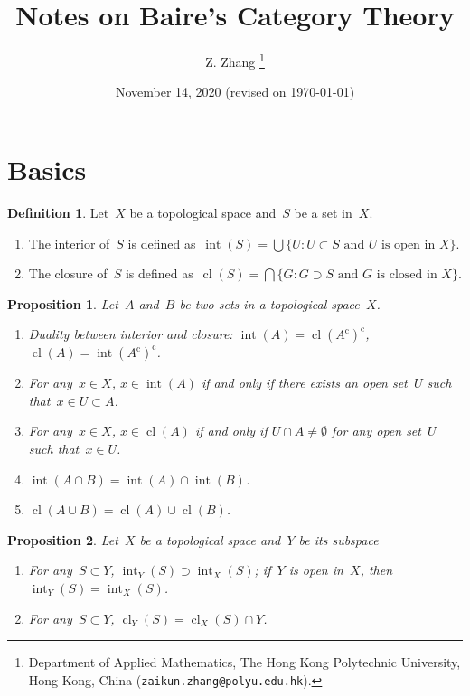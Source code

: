 \documentclass[11pt,a4paper]{article}
\title{Notes on Baire's Category Theory}
\date{November 14, 2020 (revised on \today)}
\author{
Z. Zhang
\thanks{
Department of Applied Mathematics, The Hong Kong Polytechnic
University, Hong Kong, China ({\tt zaikun.zhang@polyu.edu.hk}).
}
}
\newtheorem{proposition}{Proposition}[section]
\theoremstyle{definition}
\newtheorem{definition}{Definition}[section]
\newcommand{\co}{{\mathrm{c}}}
\DeclareMathOperator{\inter}{int}
\DeclareMathOperator{\cl}{cl}
\numberwithin{equation}{section}
\begin{document}
\maketitle

\section{Basics}

\begin{definition}
  \label{def:intcl}
  Let~$X$ be a topological space and~$S$ be a set in~$X$. 
  \begin{enumerate}
    \item The interior of~$S$ is defined as~$\inter(S) = \bigcup\{U \mathrel{:} U\subset S \text{ and } U \text{ is open in } X\}$. 
    \item The closure of~$S$ is defined as~$\cl(S) = \bigcap\{G \mathrel{:} G\supset S \text{ and } G \text{ is closed in } X\}$. 
  \end{enumerate}
\end{definition}


\begin{proposition}
  \label{prop:intcl}
  Let~$A$ and~$B$ be two sets in a topological space~$X$. 
  \begin{enumerate}
    \item Duality between interior and closure: $\inter(A) = \cl(A^\co)^\co$, $\cl(A)=\inter(A^\co)^\co$.
    \item For any~$x\in X$, $x\in \inter(A)$ if and only if there exists an open set~$U$ such that~$x\in U \subset A$. 
    \item For any~$x\in X$, $x\in \cl(A)$ if and only if $U\cap A \neq \emptyset$ for any open set~$U$ such that~$x\in U$.
    \item $\inter(A\cap B) = \inter(A)\cap \inter(B)$.
    \item $\cl(A\cup B) = \cl(A)\cup \cl(B)$. 
    \end{enumerate}
\end{proposition}

\begin{proposition}
  \label{prop:subintcl}
  Let~$X$ be a topological space and~$Y$ be its subspace
  \begin{enumerate}
    \item For any~$S\subset Y$, $\inter_Y(S) \supset \inter_X(S)$;
      if~$Y$ is open in~$X$, then $\inter_Y(S)=\inter_X(S)$.
    \item For any~$S\subset Y$, $\cl_Y(S) = \cl_X(S) \cap Y$. 
  \end{enumerate}
\end{proposition}
\end{document}
